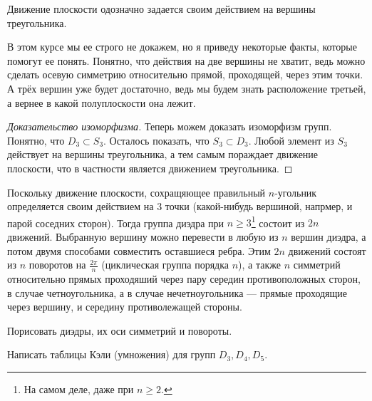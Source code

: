 \begin{lemma}
    Движение плоскости одозначно задается своим действием на вершины треугольника.
\end{lemma}

В этом курсе мы ее строго не докажем, но я приведу некоторые факты, которые помогут ее понять. Понятно, что действия на две вершины не хватит, ведь можно сделать осевую симметрию относительно прямой, проходящей, через этим точки. А трёх вершин уже будет достаточно, ведь мы будем знать расположение третьей, а вернее в какой полуплоскости она лежит.

\begin{proof}
    [Доказательство изоморфизма]
    Теперь можем доказать изоморфизм групп. Понятно, что $D_3 \subset S_3$. Осталось показать, что $S_3 \subset D_3$. Любой элемент из $S_3$ действует на вершины треугольника, а тем самым пораждает движение плоскости, что в частности является движением треугольника.
\end{proof}

Поскольку движение плоскости, сохращяющее правильный $n$-угольник определяется своим действием на 3 точки (какой-нибудь вершиной, напрмер, и парой соседних сторон). Тогда группа диэдра при $n \geqslant 3$\footnote{На самом деле, даже при $n \geqslant 2$.} состоит из $2n$ движений. Выбранную вершину можно перевести в любую из $n$ вершин диэдра, а потом двумя способами совместить оставшиеся ребра. Этим $2n$ движений состоят из $n$ поворотов на $\frac{2\pi}{n}$ (циклическая группа порядка $n$), а также $n$ симметрий относительно прямых проходяший через пару середин противоположных сторон, в случае четноугольника, а в случае нечетноугольника --- прямые проходящие через вершину, и середину противолежащей стороны.

\begin{practice}
    Порисовать диэдры, их оси симметрий и повороты. 
\end{practice}
\begin{practice}
    Написать таблицы Кэли (умножения) для групп $D_3, D_4, D_5$.
\end{practice}


